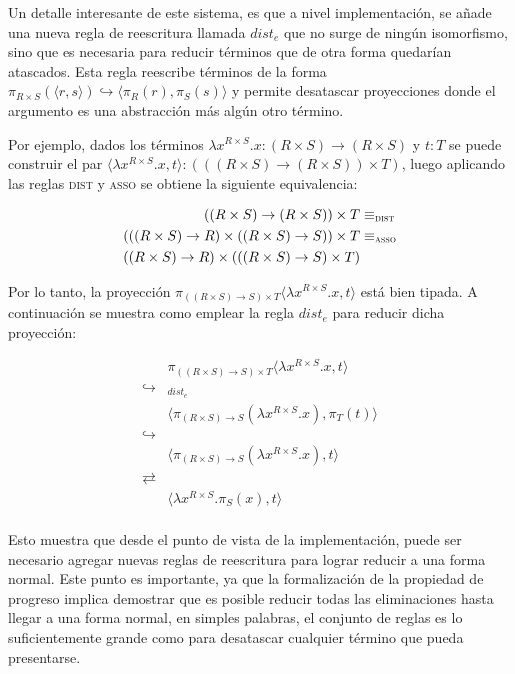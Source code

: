 Un detalle interesante de este sistema, es que a nivel implementación, se añade una nueva regla de reescritura llamada $dist_e$ que no surge de ningún isomorfismo, sino que es necesaria para reducir términos que de otra forma quedarían atascados.
Esta regla reescribe términos de la forma
$\pi_{R \times S}(\langle r,s \rangle) \hookrightarrow \langle \pi_R(r), \pi_S(s) \rangle$
y permite desatascar proyecciones donde el argumento es una abstracción más algún otro término.

Por ejemplo, dados los términos $\lambda x^{R \times S}.x: (R \times S) \rightarrow (R \times S)$ y $t : T$ se puede construir el par $\langle \lambda x^{R \times S}.x, t \rangle: (((R \times S) \rightarrow (R \times S)) \times T)$, luego aplicando las reglas \textsc{dist} y \textsc{asso} se obtiene la siguiente equivalencia:

\begin{align*}
	((R \times S) \rightarrow (R \times S)) \times T& \equiv_\textsc{dist} \\
	(((R \times S) \rightarrow R) \times ((R \times S) \rightarrow S)) \times T& \equiv_\textsc{asso} \\
	((R \times S) \rightarrow R) \times (((R \times S) \rightarrow S) \times T)& 
\end{align*}

Por lo tanto, la proyección $\pi_{((R \times S) \rightarrow S) \times T } \langle \lambda x^{R \times S}.x, t \rangle$ está bien tipada.
A continuación se muestra como emplear la regla $dist_e$ para reducir dicha proyección:

\begin{align*}
	& \pi_{((R \times S) \rightarrow S) \times T } \langle \lambda x^{R \times S}.x, t \rangle \\
	\hookrightarrow&_{dist_e} \\
	& \langle \pi_{(R \times S) \rightarrow S}(\lambda x^{R \times S}.x), \pi_T(t) \rangle \\
	\hookrightarrow& \\
	& \langle \pi_{(R \times S) \rightarrow S}(\lambda x^{R \times S}.x), t \rangle \\
	\rightleftarrows& \\
	& \langle \lambda x^{R \times S}. \pi_S(x) , t \rangle \\
\end{align*}

Esto muestra que desde el punto de vista de la implementación, puede ser necesario agregar nuevas reglas de reescritura para lograr reducir a una forma normal.
Este punto es importante, ya que la formalización de la propiedad de progreso implica demostrar que es posible reducir todas las eliminaciones hasta llegar a una forma normal, en simples palabras, el conjunto de reglas es lo suficientemente grande como para desatascar cualquier término que pueda presentarse.
	
